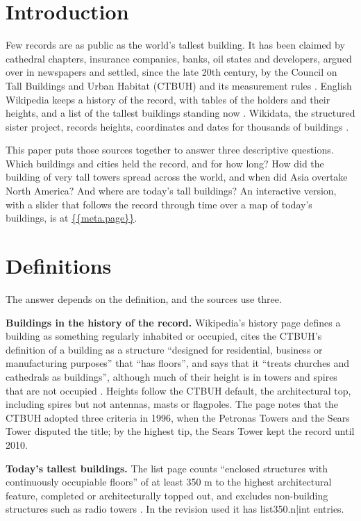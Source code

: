 \documentclass[11pt,a4paper]{article}
\begin{document}
\section{Introduction}
Few records are as public as the world's tallest building. It has been claimed by cathedral chapters, insurance companies, banks, oil states and developers, argued over in newspapers and settled, since the late 20th century, by the Council on Tall Buildings and Urban Habitat (CTBUH) and its measurement rules \citep{ctbuh}. English Wikipedia keeps a history of the record, with tables of the holders and their heights, and a list of the tallest buildings standing now \citep{wphist,wplist}. Wikidata, the structured sister project, records heights, coordinates and dates for thousands of buildings \citep{wikidata}.

This paper puts those sources together to answer three descriptive questions. Which buildings and cities held the record, and for how long? How did the building of very tall towers spread across the world, and when did Asia overtake North America? And where are today's tall buildings? An interactive version, with a slider that follows the record through time over a map of today's buildings, is at \url{{{meta.page}}}.

\section{Definitions}
The answer depends on the definition, and the sources use three.

\textbf{Buildings in the history of the record.} Wikipedia's history page defines a building as something regularly inhabited or occupied, cites the CTBUH's definition of a building as a structure ``designed for residential, business or manufacturing purposes'' that ``has floors'', and says that it ``treats churches and cathedrals as buildings'', although much of their height is in towers and spires that are not occupied \citep{wphist}. Heights follow the CTBUH default, the architectural top, including spires but not antennas, masts or flagpoles. The page notes that the CTBUH adopted three criteria in 1996, when the Petronas Towers and the Sears Tower disputed the title; by the highest tip, the Sears Tower kept the record until 2010.

\textbf{Today's tallest buildings.} The list page counts ``enclosed structures with continuously occupiable floors'' of at least 350 m to the highest architectural feature, completed or architecturally topped out, and excludes non-building structures such as radio towers \citep{wplist}. In the revision used it has {{list350.n|int}} entries.
\end{document}
